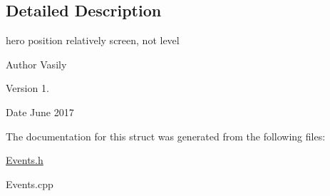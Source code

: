 \subsection{Detailed Description}
hero position relatively screen, not level 

\begin{DoxyAuthor}{Author}
Vasily 
\end{DoxyAuthor}
\begin{DoxyVersion}{Version}
1. 
\end{DoxyVersion}
\begin{DoxyDate}{Date}
June 2017 
\end{DoxyDate}


The documentation for this struct was generated from the following files\+:\begin{DoxyCompactItemize}
\item 
\hyperlink{_events_8h}{Events.\+h}\item 
Events.\+cpp\end{DoxyCompactItemize}
